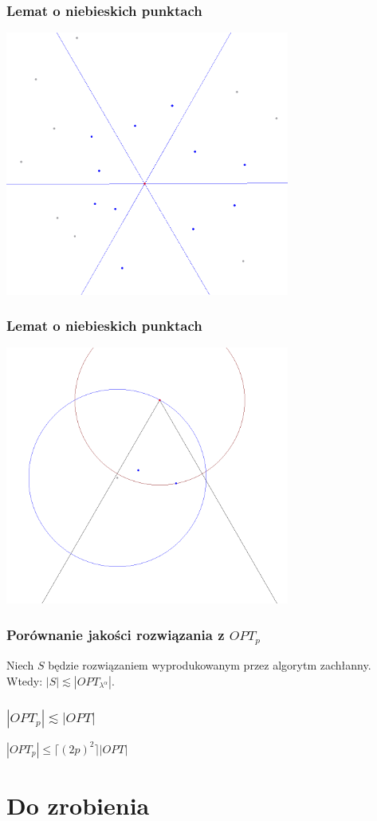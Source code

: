 \documentclass[polish, t,10pt]{beamer}
\begin{document}
\begin{frame}
    \frametitle{Lemat o niebieskich punktach}
    \centering
    \includegraphics[width=0.7\textwidth]{pictures/blue-dominant-1.png}
\end{frame}

\begin{frame}
    \frametitle{Lemat o niebieskich punktach}
    \centering
    \includegraphics[width=0.7\textwidth]{pictures/blue-dominant-2.png}
\end{frame}

\begin{frame}
    \frametitle{Porównanie jakości rozwiązania z $OPT_p$}
    \begin{lemma}
        Niech $S$ będzie rozwiązaniem wyprodukowanym przez algorytm zachłanny. Wtedy:
        $|S| \lesssim |OPT_{\lambda^{\alpha}}|$.
    \end{lemma}
\end{frame}

\begin{frame}
    \frametitle{$|OPT_p| \lesssim |OPT|$}
    \begin{lemma}
        $|OPT_p| \le \lceil (2p)^2 \rceil |OPT|$
    \end{lemma}
\end{frame}

\section{Do zrobienia}
\end{document}

